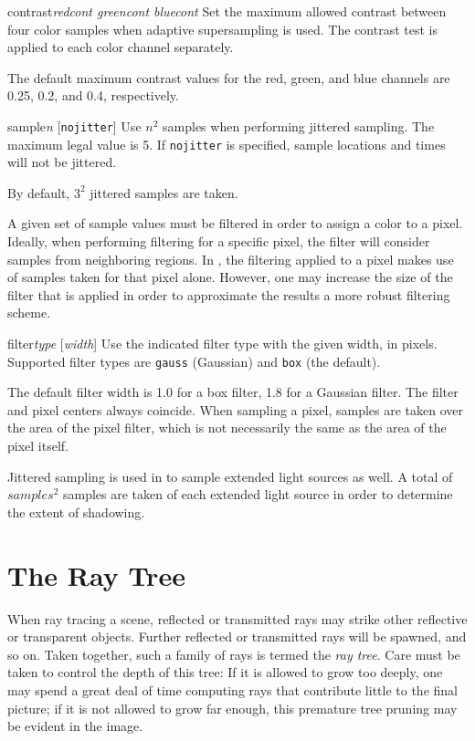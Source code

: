 \begin{defkey}{contrast}{{\em redcont greencont bluecont}}
	Set the maximum allowed contrast between four color
	samples when adaptive supersampling is used.
	The contrast test is applied to each color
	channel separately.
\end{defkey}
The default maximum contrast values for the red, green, and blue
channels are 0.25, 0.2, and 0.4, respectively.

\begin{defkey}{sample}{{\em n} [{\tt nojitter}]}
	Use $n^{2} $ samples when performing jittered
	sampling.  The maximum legal value is 5.
	If {\tt nojitter} is specified, sample locations
	and times will not be jittered.
\end{defkey}
By default, $3^{2}$ jittered samples are taken.

A given set of sample values must be filtered
in order to
assign a color to a pixel.  Ideally, when performing filtering
for a specific pixel,
the filter will consider samples from neighboring regions.  In
{\rayshade}, the filtering applied to a pixel makes use of samples
taken for that pixel alone.  However, one may increase the size
of the filter that is applied in order to approximate the results
a more robust filtering scheme.

\begin{defkey}{filter}{{\em type} [{\em width}]}
	Use the indicated filter type with the given width,
	in pixels.
	Supported filter types are {\tt gauss} (Gaussian)
	and {\tt box} (the default).
\end{defkey}
The default filter width is 1.0 for a box filter, 1.8 for a Gaussian
filter.  The filter and pixel centers always coincide.
When sampling a pixel, samples are taken over the area of
the pixel filter, which is not necessarily the same as the area
of the pixel itself.

Jittered sampling is used in {\rayshade} to sample extended light
sources as well.  A total of $samples^2$ samples are taken of
each extended light source in order to determine the extent of shadowing.

\section{The Ray Tree}

When ray tracing a scene, reflected or transmitted rays may strike
other reflective or transparent objects.  Further reflected or
transmitted rays will be spawned, and so on.  Taken together, such
a family of rays is termed the {\em ray tree}.  Care must be taken
to control the depth of this tree:  If it is allowed to grow too deeply,
one may spend a great deal of time computing rays that contribute little
to the final picture; if it is not allowed to grow far enough, this
premature tree pruning may be evident in the image.

